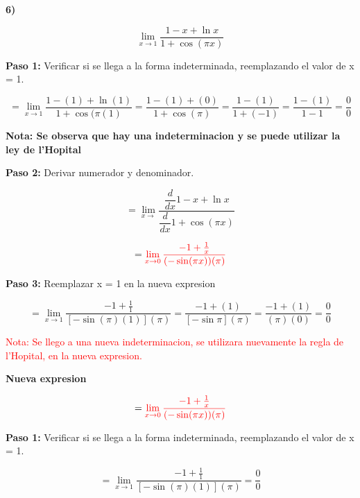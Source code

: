 \documentclass[12pt,a4paper]{article}
\begin{document}
\textbf{6)}

\[
\lim_{x \to 1} \frac{1-x+\ln x}{1+\cos (\pi x)} 
\]


\vspace{0.2cm}

\textbf{Paso 1:}
\vspace{0.2cm}
Verificar si se llega a la forma indeterminada, reemplazando el valor de x = 1.

\[
= \lim_{x \to 1} \frac{1-(1)+\ln (1)}{1+\cos (\pi (1)}= \frac{1-(1)+ (0)}{1+\cos (\pi)}= \frac{1-(1)}{1+(-1)}= \frac{1-(1)}{1-1}= \frac{0}{0}
\]

\vspace{0.2cm}

\textbf{Nota: Se observa que hay una indeterminacion y se puede utilizar la ley de l'Hopital }

\vspace{0.5cm}

\textbf{Paso 2:}
\vspace{0.2cm}
Derivar numerador y denominador.

\[
= \lim_{x \to } \frac{\dfrac{d}{dx} 1-x+\ln x}{\dfrac{d}{dx} 1+\cos (\pi x)}
\]

\[
= \textcolor{red}{\lim_{x \to 0} \frac{-1+\frac{1}{x}}{(-\sin(\pi x))(\pi)}}
\]

\vspace{0.2cm}



\textbf{Paso 3:}
\vspace{0.2cm}
Reemplazar x = 1 en la nueva expresion

\[
= \lim_{x \to 1} \frac{-1+ \frac{1}{1}}{[-\sin(\pi) (1)](\pi)} = \frac{-1+(1)}{[-\sin \pi] (\pi)} = \frac{-1+(1)}{(\pi)(0)}= \frac{0}{0}
\]



\textcolor{red}{Nota: Se llego a una nueva indeterminacion, se utilizara nuevamente la regla de l'Hopital, en la nueva expresion.}

\vspace{0.2cm}

\textbf{Nueva expresion}

\[
= \textcolor{red}{\lim_{x \to 0} \frac{-1+\frac{1}{x}}{(-\sin(\pi x))(\pi)}}
\]


\textbf{Paso 1:}
\vspace{0.2cm}
Verificar si se llega a la forma indeterminada, reemplazando el valor de x = 1.

\[
= \lim_{x \to 1} \frac{-1+ \frac{1}{1}}{[-\sin(\pi) (1)](\pi)} = \frac{0}{0}
\]
\end{document}
